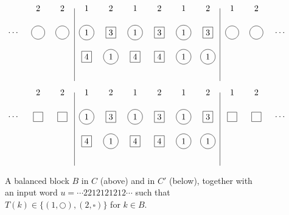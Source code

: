 \documentclass[reqno]{amsart}
\newcommand{\0}{\phantom{c}}
\theoremstyle{plain}
\theoremstyle{definition}
\numberwithin{equation}{section}
\begin{document}
\begin{figure}
\[
\begin{tikzpicture}
\draw (-0.5,6)--(-0.5,3);
\draw (5.5,6)--(5.5,3);
  \node at(-2,6){2};
  \node at(-1,6){2};
  \node at (0,6){1};
  \node at (1,6){2};
  \node at (2,6){1};
  \node at (3,6){2};
  \node at (4,6){1};
  \node at (5,6){2};
  \node at (6,6){1};
  \node at (7,6){2};
  \node[circle,draw=black] at (0, 5){1};
  \node[rectangle,draw=black] at (1, 5){3};
  \node[circle,draw=black] at (2, 5){1};
  \node[rectangle, draw=black] at (3, 5){3};
  \node[circle,draw=black] at (4, 5){1};
  \node[rectangle,draw=black] at (5, 5){3};
  \node[rectangle,draw=black] at (0, 4){4};
  \node[circle, draw=black] at (1, 4){1};
  \node[rectangle,draw=black] at (2, 4){4};
  \node[rectangle,draw=black] at (3, 4){4};
  \node[circle,draw=black] at (4, 4){1};
  \node[circle, draw=black] at (5, 4){1};
  \node[circle,draw=black] at (-1, 5){\0};
  \node[circle,draw=black] at (-2, 5){\0};
  \node at (-3,5){\dots};
  \node[circle,draw=black] at (6, 5){\0};
  \node[circle,draw=black] at (7, 5){\0};
  \node at (8,5){\dots};
\end{tikzpicture}
\]
\[
\begin{tikzpicture}
  \node at(-2,6){2};
  \node at(-1,6){2};
  \node at (0,6){1};
  \node at (1,6){2};
  \node at (2,6){1};
  \node at (3,6){2};
  \node at (4,6){1};
  \node at (5,6){2};
  \node at (6,6){1};
  \node at (7,6){2};

\draw (-0.5,6)--(-0.5,3);
\draw (5.5,6)--(5.5,3);
  \node[circle,draw=black] at (0, 5){1};
  \node[rectangle,draw=black] at (1, 5){3};
  \node[circle,draw=black] at (2, 5){1};
  \node[rectangle, draw=black] at (3, 5){3};
  \node[circle,draw=black] at (4, 5){1};
  \node[rectangle,draw=black] at (5, 5){3};

  \node[rectangle,draw=black] at (0, 4){4};
  \node[circle, draw=black] at (1, 4){1};
  \node[rectangle,draw=black] at (2, 4){4};
  \node[rectangle,draw=black] at (3, 4){4};
  \node[circle,draw=black] at (4, 4){1};
  \node[circle, draw=black] at (5, 4){1};
  
  \node[rectangle,draw=black] at (-1, 5){\0};
  \node[rectangle,draw=black] at (-2, 5){\0};
  \node at (-3,5){$\dotsm$};

  \node[rectangle,draw=black] at (6, 5){\0};
  \node[rectangle,draw=black] at (7, 5){\0};
  \node at (8,5){$\dotsm$};
\end{tikzpicture}
\]
\caption{A balanced block $B$ in $C$ (above) and in $C'$ (below), together with an input word $u = \dotsm 2212121212 \dotsm$ such that $T(k) \in \{(1,\bigcirc),(2,\square)\}$ for $k \in B$.}
\end{figure}
\end{document}
